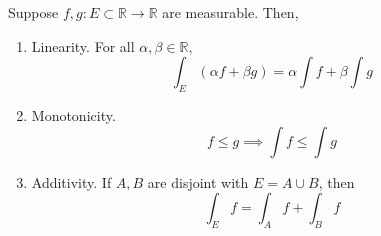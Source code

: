   \begin{theorem}
    \label{thm:axiomatic-properties-of-lebesgue-integral-for-3}
    Suppose $f, g : E \subset \mathbb{R} \to \mathbb{R}$ are measurable. Then, 
    \begin{enumerate}
      \item Linearity. For all $\alpha, \beta \in \mathbb{R}$, 
        \begin{equation}
          \int_E (\alpha f + \beta g) = \alpha \int f + \beta \int g
        \end{equation}

      \item Monotonicity. 
        \begin{equation}
          f \leq g \implies \int f \leq \int g
        \end{equation}

      \item Additivity. If $A, B$ are disjoint with $E = A \cup B$, then 
        \begin{equation}
          \int_E f = \int_A f + \int_B f
        \end{equation}
    \end{enumerate}
  \end{theorem} 
